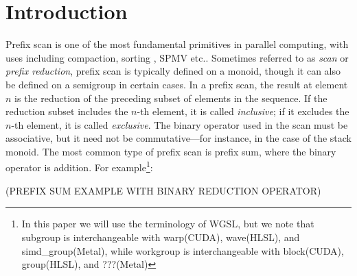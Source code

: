 \documentclass[sigconf]{acmart}
\begin{document}



\maketitle

\section{Introduction}
Prefix scan is one of the most fundamental primitives in parallel computing, with uses including compaction, sorting \cite{10.1145/3035918.3064043, adinets2022onesweepfastersignificantdigit}, SPMV \cite{} etc.. Sometimes referred to as \textit{scan} or \textit{prefix reduction}, prefix scan is typically defined on a monoid, though it can also be defined on a semigroup in certain cases\cite{10.1007/978-3-540-27764-4_11}. In a prefix scan, the result at element $n$ is the reduction of the preceding subset of elements in the sequence. If the reduction subset includes the $n$-th element, it is called \textit{inclusive}; if it excludes the $n$-th element, it is called \textit{exclusive}. The binary operator used in the scan must be associative, but it need not be commutative—for instance, in the case of the stack monoid. The most common type of prefix scan is prefix sum, where the binary operator is addition. For example\footnote{In this paper we will use the terminology of WGSL, but we note that subgroup is interchangeable with warp(CUDA), wave(HLSL), and simd\_group(Metal), while workgroup is interchangeable with block(CUDA), group(HLSL), and ???(Metal)}: 

(PREFIX SUM EXAMPLE WITH BINARY REDUCTION OPERATOR)
\end{document}
